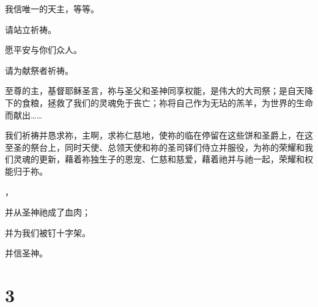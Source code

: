\par

我信唯一的天主，等等。\par

\par

请站立祈祷。\par

\par

愿平安与你们众人。\par

\par

请为献祭者祈祷。\par

\par

至尊的主，基督耶稣圣言，祢与圣父和圣神同享权能，是伟大的大司祭；是自天降下的食粮，拯救了我们的灵魂免于丧亡；祢将自己作为无玷的羔羊，为世界的生命而献出……\par

我们祈祷并恳求祢，主啊，求祢仁慈地，使祢的临在停留在这些饼和圣爵上，在这至圣的祭台上，同时天使、总领天使和祢的圣司铎们侍立并服役，为祢的荣耀和我们灵魂的更新，藉着祢独生子的恩宠、仁慈和慈爱，藉着祂并与祂一起，荣耀和权能归于祢。\par

，\par

并从圣神祂成了血肉；\par

\par

并为我们被钉十字架。\par

\par

并信圣神。\par


\section{3}

\par

